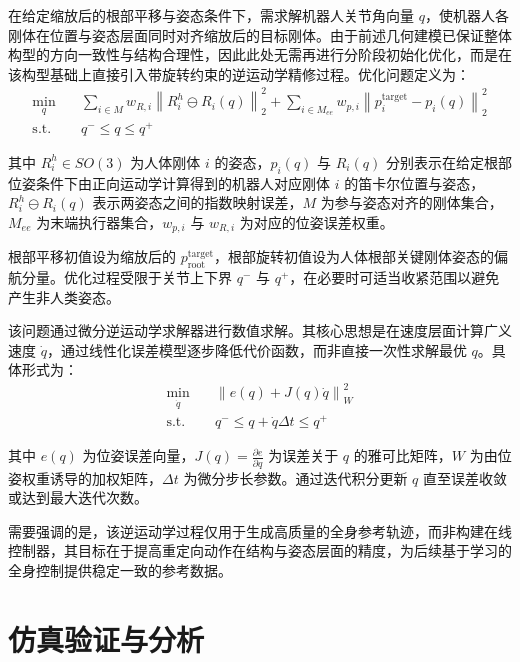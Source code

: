  在给定缩放后的根部平移与姿态条件下，需求解机器人关节角向量 $q$，使机器人各刚体在位置与姿态层面同时对齐缩放后的目标刚体。由于前述几何建模已保证整体构型的方向一致性与结构合理性，因此此处无需再进行分阶段初始化优化，而是在该构型基础上直接引入带旋转约束的逆运动学精修过程。优化问题定义为：
 \begin{equation}
 	\begin{aligned}
 		\min_{q} \quad 
 		& \sum_{i \in M} w_{R,i} \left\| R^h_i \ominus R_i(q) \right\|_2^2 
 		+ \sum_{i \in M_{ee}} w_{p,i} \left\| p^{\text{target}}_i - p_i(q) \right\|_2^2 \\
 		\text{s.t.} \quad 
 		& q^- \leq q \leq q^+ 
 	\end{aligned}
 \end{equation}
 
 其中 $R^h_i \in SO(3)$ 为人体刚体 $i$ 的姿态，$p_i(q)$ 与 $R_i(q)$ 分别表示在给定根部位姿条件下由正向运动学计算得到的机器人对应刚体 $i$ 的笛卡尔位置与姿态，$R^h_i \ominus R_i(q)$ 表示两姿态之间的指数映射误差，$M$ 为参与姿态对齐的刚体集合，$M_{ee}$ 为末端执行器集合，$w_{p,i}$ 与 $w_{R,i}$ 为对应的位姿误差权重。
 
 根部平移初值设为缩放后的 $p^{\text{target}}_{\text{root}}$，根部旋转初值设为人体根部关键刚体姿态的偏航分量。优化过程受限于关节上下界 $q^-$ 与 $q^+$，在必要时可适当收紧范围以避免产生非人类姿态。
 
 该问题通过微分逆运动学求解器进行数值求解。其核心思想是在速度层面计算广义速度 $\dot{q}$，通过线性化误差模型逐步降低代价函数，而非直接一次性求解最优 $q$。具体形式为：
\begin{equation}
	\begin{aligned}
		\min_{\dot{q}} \quad & \left\| e(q) + J(q)\dot{q} \right\|_W^2 \\
		\text{s.t.} \quad & q^- \leq q + \dot{q}\Delta t \leq q^+ 
	\end{aligned}
\end{equation}

 其中 $e(q)$ 为位姿误差向量，$J(q)=\frac{\partial e}{\partial q}$ 为误差关于 $q$ 的雅可比矩阵，$W$ 为由位姿权重诱导的加权矩阵，$\Delta t$ 为微分步长参数。通过迭代积分更新 $q$ 直至误差收敛或达到最大迭代次数。
 
 需要强调的是，该逆运动学过程仅用于生成高质量的全身参考轨迹，而非构建在线控制器，其目标在于提高重定向动作在结构与姿态层面的精度，为后续基于学习的全身控制提供稳定一致的参考数据。

\section{仿真验证与分析}
